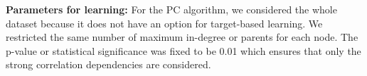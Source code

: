 \documentclass[conference]{IEEEtran}
\begin{document}
\textbf{Parameters for learning:}
For the PC algorithm, we considered the whole dataset because it does not have an option for target-based learning. We restricted the same number of maximum in-degree or parents for each node. The p-value or statistical significance was fixed to be 0.01 which ensures that only the strong correlation dependencies are considered.

\begin{table}[h!]
\centering
\caption{Peter \& Clark Algorithm Parameters}
\label{tab:learning_summary}
\renewcommand{\arraystretch}{1.3}
\end{table}
\end{document}
